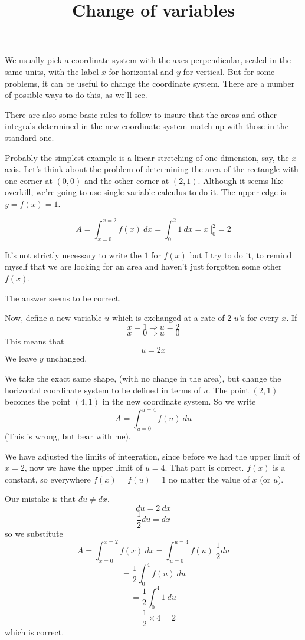 \documentclass[11pt, oneside]{article}
\title{Change of variables}
\date{}
\begin{document}
\maketitle
\Large


\label{sec:Change_of_variables}

We usually pick a coordinate system with the axes perpendicular, scaled in the same units, with the label $x$ for horizontal and $y$ for vertical.  But for some problems, it can be useful to change the coordinate system.  There are a number of possible ways to do this, as we'll see.  

There are also some basic rules to follow to insure that the areas and other integrals determined in the new coordinate system match up with those in the standard one.

Probably the simplest example is a linear stretching of one dimension, say, the $x$-axis.  Let's think about the problem of determining the area of the rectangle with one corner at $(0,0)$ and the other corner at $(2,1)$.  Although it seems like overkill, we're going to use single variable calculus to do it.  The upper edge is $y = f(x) = 1$.

\[ A = \int_{x=0}^{x=2} f(x)\ dx = \int_0^2 1\ dx = x  \ \bigg |_{0}^{2} = 2 \]

It's not strictly necessary to write the $1$ for $f(x)$ but I try to do it, to remind myself that we are looking for an area and haven't just forgotten some other $f(x)$.

The answer seems to be correct.

Now, define a new variable $u$ which is exchanged at a rate of 2 $u$'s for every $x$.  If 
\[ x = 1\Rightarrow u = 2 \]
\[ x = 0\Rightarrow u = 0 \]
This means that 
\[ u  = 2x \]
We leave $y$ unchanged.

We take the exact same shape, (with no change in the area), but change the horizontal coordinate system to be defined in terms of $u$.  The point $(2,1)$ becomes the point $(4,1)$ in the new coordinate system.  So we write
\[ A = \int_{u=0}^{u=4} f(u)\ du  \]
(This is wrong, but bear with me).  

We have adjusted the limits of integration, since before we had the upper limit of $x=2$, now we have the upper limit of $u=4$.  That part is correct.  $f(x)$ is a constant, so everywhere $f(x) = f(u) = 1$ no matter the value of $x$ (or $u$).

Our mistake is that $du \neq dx$.
\[ du = 2\ dx \]
\[ \frac{1}{2} du = dx \]
so we substitute
\[ A = \int_{x=0}^{x=2} f(x)\ dx =  \int_{u=0}^{u=4} f(u)\ \frac{1}{2}du \]
\[ =  \frac{1}{2} \int_0^4 f(u)\ du \]
\[ = \frac{1}{2} \int_0^4 1\ du \]
\[ =  \frac{1}{2} \times 4 = 2 \]
which is correct.
\end{document}
